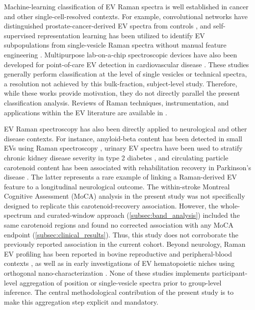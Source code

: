 \documentclass[preprint,12pt]{elsarticle}
\begin{document}
Machine-learning classification of EV Raman spectra is well established in cancer and other single-cell-resolved contexts. For example, convolutional networks have distinguished prostate-cancer-derived EV spectra from controls \cite{lee2020}, and self-supervised representation learning has been utilized to identify EV subpopulations from single-vesicle Raman spectra without manual feature engineering \cite{jensen2024}. Multipurpose lab-on-a-chip spectroscopic devices have also been developed for point-of-care EV detection in cardiovascular disease \cite{buchan2025}. These studies generally perform classification at the level of single vesicles or technical spectra, a resolution not achieved by this bulk-fraction, subject-level study. Therefore, while these works provide motivation, they do not directly parallel the present classification analysis. Reviews of Raman techniques, instrumentation, and applications within the EV literature are available in \cite{liu2025}.

EV Raman spectroscopy has also been directly applied to neurological and other disease contexts. For instance, amyloid-beta content has been detected in small EVs using Raman spectroscopy \cite{imanbekova2021}, urinary EV spectra have been used to stratify chronic kidney disease severity in type 2 diabetes \cite{kaminska2022}, and circulating particle carotenoid content has been associated with rehabilitation recovery in Parkinson's disease \cite{gualerzi2025}. The latter represents a rare example of linking a Raman-derived EV feature to a longitudinal neurological outcome. The within-stroke Montreal Cognitive Assessment (MoCA) analysis in the present study was not specifically designed to replicate this carotenoid-recovery association. However, the whole-spectrum and curated-window approach (\cref{subsec:band_analysis}) included the same carotenoid regions and found no corrected association with any MoCA endpoint (\cref{subsec:clinical_results}). Thus, this study does not corroborate the previously reported association in the current cohort. Beyond neurology, Raman EV profiling has been reported in bovine reproductive and peripheral-blood contexts \cite{zhang2020}, as well as in early investigations of EV hematopoietic niches using orthogonal nano-characterization \cite{grenier2025}. None of these studies implements participant-level aggregation of position or single-vesicle spectra prior to group-level inference. The central methodological contribution of the present study is to make this aggregation step explicit and mandatory.
\end{document}
